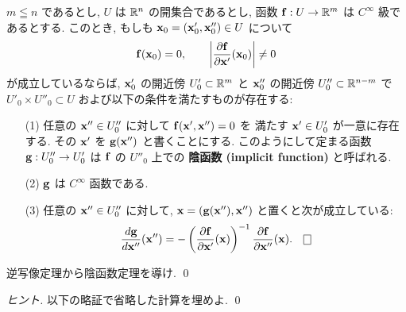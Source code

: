 \documentclass[12pt,twoside]{jarticle}
\begin{document}
\begin{theorem}
 $m\leqq n$ であるとし, %
 $U$ は ${\mathbb R}^n$ の開集合であるとし, 
 函数 ${\mathbf f}:U\to {\mathbb R}^m$ は $C^\infty$ 級であるとする.
 このとき, もしも ${\mathbf x}_0=({\mathbf x}'_0,{\mathbf x}''_0)\in U$ について
 \begin{equation*}
  {\mathbf f}({\mathbf x}_0) = 0, \qquad
  \left| \dfrac{\partial{\mathbf f}}{\partial{\mathbf x}'}({\mathbf x}_0) \right| \ne 0
 \end{equation*}
 が成立しているならば, 
 ${\mathbf x}'_0$ の開近傍 $U'_0\subset{\mathbb R}^m$ 
 と ${\mathbf x}''_0$ の開近傍 $U''_0\subset{\mathbb R}^{n-m}$ で
 $U'_0\times U''_0\subset U$ および以下の条件を満たすものが存在する:
 \begin{enumerate}
  \item[(1)] 任意の ${\mathbf x}''\in U''_0$ に対して ${\mathbf f}({\mathbf x}',{\mathbf x}'')=0$ を
   満たす ${\mathbf x}'\in U'_0$ が一意に存在する.
   その ${\mathbf x}'$ を ${\mathbf g}({\mathbf x}'')$ と書くことにする. 
   このようにして定まる函数 ${\mathbf g}:U''_0\to U'_0$ は ${\mathbf f}$ の $U''_0$ 上での
   {\bf 陰函数 (implicit function)} と呼ばれる.
  \item[(2)] ${\mathbf g}$ は $C^\infty$ 函数である.
  \item[(3)] 任意の ${\mathbf x}''\in U''_0$ に対して, 
   ${\mathbf x}=({\mathbf g}({\mathbf x}''),{\mathbf x}'')$ と置くと次が成立している:
   \begin{equation*}
    \dfrac{d\g}{d\x''}(\x'')
    = - \left(\dfrac{\d\f}{\d\x'}(\x)\right)^{-1} \dfrac{\d\f}{\d\x''}(\x).
    \qed
   \end{equation*}
 \end{enumerate}
\end{theorem}

\begin{question}
 逆写像定理から陰函数定理を導け. \qed
\end{question}

\begin{proof}[ヒント]
 以下の略証で省略した計算を埋めよ. \qed
\end{proof}
\end{document}
